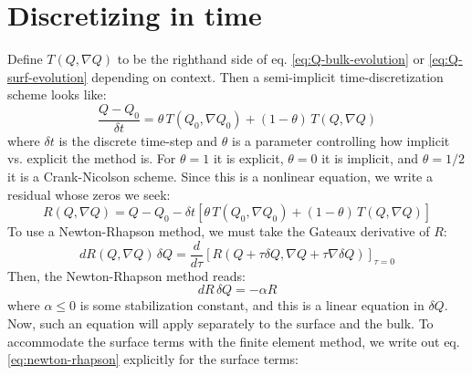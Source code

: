 \documentclass[reqno]{article}
\begin{document}
\section{Discretizing in time}

Define $T(Q, \nabla Q)$ to be the righthand side of eq. \eqref{eq:Q-bulk-evolution} or \eqref{eq:Q-surf-evolution} depending on context.
Then a semi-implicit time-discretization scheme looks like:
\begin{equation}
    \frac{Q - Q_0}{\delta t} 
    =
    \theta \, T(Q_0, \nabla Q_0)
    + (1 - \theta) \, T(Q, \nabla Q)
\end{equation}
where $\delta t$ is the discrete time-step and $\theta$ is a parameter controlling how implicit vs. explicit the method is.
For $\theta = 1$ it is explicit, $\theta = 0$ it is implicit, and $\theta = 1/2$ it is a Crank-Nicolson scheme.
Since this is a nonlinear equation, we write a residual whose zeros we seek:
\begin{equation}
    R(Q, \nabla Q)
    =
    Q - Q_0
    - \delta t \left[
        \theta \, T(Q_0, \nabla Q_0)
        + (1 - \theta) \, T(Q, \nabla Q)
    \right]
\end{equation}
To use a Newton-Rhapson method, we must take the Gateaux derivative of $R$:
\begin{equation}
    dR(Q, \nabla Q) \, \delta Q
    =
    \frac{d}{d \tau}
    \left[
        R(Q + \tau \delta Q, \nabla Q + \tau \nabla \delta Q)
    \right]_{\tau = 0}
\end{equation}
Then, the Newton-Rhapson method reads:
\begin{equation} \label{eq:newton-rhapson}
    dR \, \delta Q 
    = -\alpha R
\end{equation}
where $\alpha \leq 0$ is some stabilization constant, and this is a linear equation in $\delta Q$.
Now, such an equation will apply separately to the surface and the bulk.
To accommodate the surface terms with the finite element method, we write out eq. \eqref{eq:newton-rhapson} explicitly for the surface terms:
\end{document}
